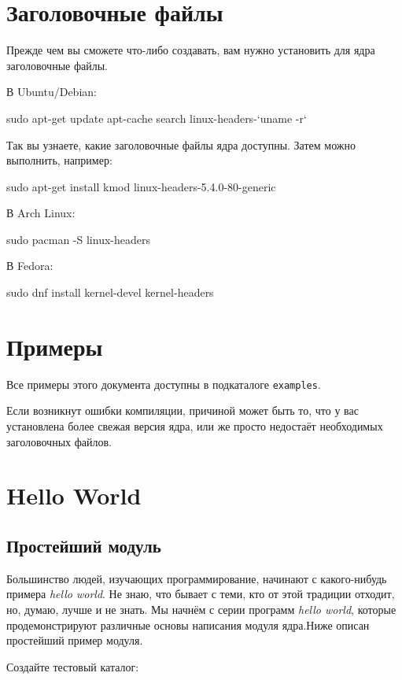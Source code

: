 \documentclass[10pt, oneside]{book}
\begin{document}
\section{Заголовочные файлы}
\label{sec:headers}
Прежде чем вы сможете что-либо создавать, вам нужно установить для ядра заголовочные файлы.

В Ubuntu/Debian:
\begin{codebash}
sudo apt-get update
apt-cache search linux-headers-`uname -r`
\end{codebash}

Так вы узнаете, какие заголовочные файлы ядра доступны. Затем можно выполнить, например:
\begin{codebash}
sudo apt-get install kmod linux-headers-5.4.0-80-generic
\end{codebash}

В Arch Linux:
\begin{codebash}
sudo pacman -S linux-headers
\end{codebash}

В Fedora:
\begin{codebash}
sudo dnf install kernel-devel kernel-headers
\end{codebash}

\section{Примеры}
\label{sec:examples}
Все примеры этого документа доступны в подкаталоге \verb|examples|.

Если возникнут ошибки компиляции, причиной может быть то, что у вас установлена более свежая версия ядра,
или же просто недостаёт необходимых заголовочных файлов.

\section{Hello World}
\label{sec:helloworld}
\subsection{Простейший модуль}
\label{sec:org2d3e245}
Большинство людей, изучающих программирование, начинают с какого-нибудь примера \emph{hello world}. Не знаю, что бывает с теми, кто от этой традиции отходит, но, думаю, лучше и не знать. Мы начнём с серии программ \emph{hello world}, которые продемонстрируют различные основы написания модуля ядра.Ниже описан простейший пример модуля.

Создайте тестовый каталог:
\end{document}
